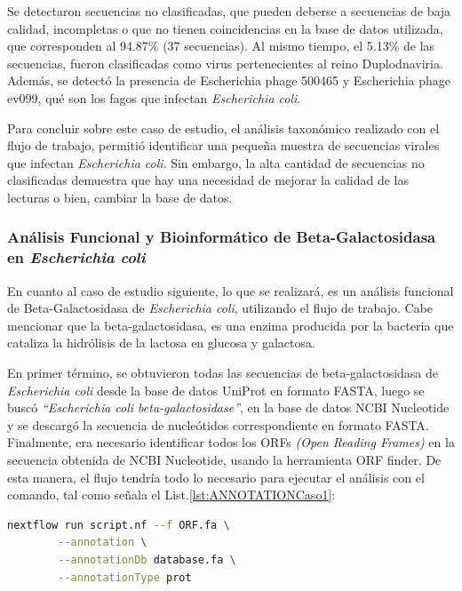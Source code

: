 \documentclass[12pt]{article}
\begin{document}
Se detectaron secuencias no clasificadas, que pueden deberse a 
secuencias de baja calidad, incompletas o que no tienen 
coincidencias en la base de datos utilizada, que corresponden 
al 94.87\% (37 secuencias). Al mismo tiempo, el  5.13\% de las 
secuencias, fueron clasificadas como virus pertenecientes 
al reino Duplodnaviria. Además, se detectó la presencia 
de Escherichia phage 500465 y Escherichia phage ev099, 
qué son los fagos que infectan \textit{Escherichia coli}.

Para concluir sobre este caso de estudio, el análisis 
taxonómico realizado con el flujo de trabajo, permitió 
identificar una pequeña muestra de secuencias virales que 
infectan \textit{Escherichia coli}. Sin embargo, la alta 
cantidad de secuencias 
no clasificadas demuestra que hay una necesidad de mejorar 
la calidad de las lecturas o bien, cambiar la base de datos.

\subsubsection*{Análisis Funcional y Bioinformático de 
Beta-Galactosidasa en \textit{Escherichia coli}}

En cuanto al caso de estudio siguiente, lo que se realizará, 
es un análisis funcional de Beta-Galactosidasa de 
\textit{Escherichia coli}, utilizando el flujo de trabajo. 
Cabe mencionar que la beta-galactosidasa, es una enzima 
producida por la bacteria que cataliza la hidrólisis de la 
lactosa en glucosa y galactosa.

En primer término, se obtuvieron todas las secuencias de 
beta-galactosidasa de \textit{Escherichia coli} desde 
la base de datos 
UniProt en formato FASTA, luego se buscó \emph{“Escherichia 
coli beta-galactosidase”}, en la base de datos NCBI 
Nucleotide y se descargó la secuencia de nucleótidos 
correspondiente en formato FASTA. Finalmente, era necesario 
identificar todos los ORFs \emph{(Open Reading Frames)} en la secuencia 
obtenida de NCBI Nucleotide, usando la herramienta ORF finder. 
De esta manera, el flujo tendría todo lo necesario para 
ejecutar el análisis con el comando, tal como señala 
el List.\ref{lst:ANNOTATIONCaso1}:

\begin{center}
    \begin{lstlisting}[language=bash, caption=Comando para la anotación funcional de \textit{Escherichia coli} \emph{(elaboración propia)}., label=lst:ANNOTATIONCaso1]
        nextflow run script.nf --f ORF.fa \
        --annotation \
        --annotationDb database.fa \
        --annotationType prot
    \end{lstlisting}
\end{center}
\end{document}
